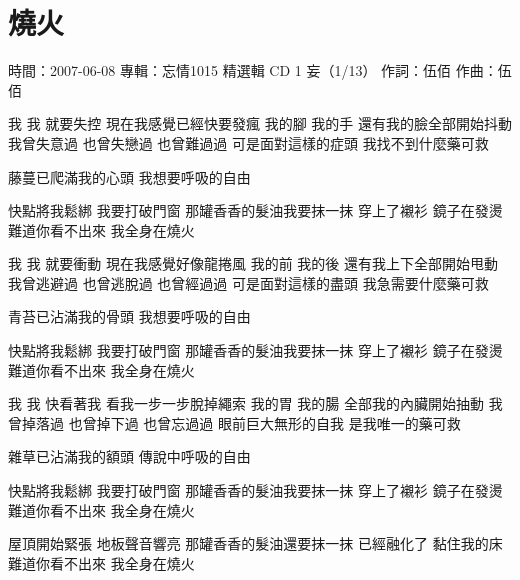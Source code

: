 \documentclass[UTF8,a4paper,oneside,twocolumn,12pt]{ctexbook}
\newcommand{\infopair}[2]{\textbullet #1：#2}
\newcommand{\zc}[1][伍佰]{\infopair{作詞}{#1}}
\newcommand{\zq}[1][伍佰]{\infopair{作曲}{#1}}
\newcommand{\zj}[1]{\infopair{專輯}{#1}}
\newcommand{\sj}[1]{\infopair{時間}{#1}}
\newenvironment{info}{\begin{flushleft}\kaishu
	}
	{\end{flushleft}\normalsize\yahei\par}
\newenvironment{lyric}{
	}
{}
\begin{document}
\section{燒火}
\begin{info}
	\sj{2007-06-08}
	\zj{忘情1015 精選輯 CD 1 妄（1/13）}
	\zc
	\zq
\end{info}
\begin{lyric}
	我 我 就要失控 現在我感覺已經快要發瘋
	我的腳 我的手 還有我的臉全部開始抖動
	我曾失意過 也曾失戀過 也曾難過過
	可是面對這樣的症頭 我找不到什麼藥可救

	藤蔓已爬滿我的心頭 我想要呼吸的自由

	快點將我鬆綁 我要打破門窗 那罐香香的髮油我要抹一抹
	穿上了襯衫 鏡子在發燙 難道你看不出來 我全身在燒火

	我 我 就要衝動 現在我感覺好像龍捲風
	我的前 我的後 還有我上下全部開始甩動
	我曾逃避過 也曾逃脫過 也曾經過過
	可是面對這樣的盡頭 我急需要什麼藥可救

	青苔已沾滿我的骨頭 我想要呼吸的自由

	快點將我鬆綁 我要打破門窗 那罐香香的髮油我要抹一抹
	穿上了襯衫 鏡子在發燙 難道你看不出來 我全身在燒火

	我 我 快看著我 看我一步一步脫掉繩索
	我的胃 我的腸 全部我的內臟開始抽動
	我曾掉落過 也曾掉下過 也曾忘過過
	眼前巨大無形的自我 是我唯一的藥可救

	雜草已沾滿我的額頭 傳說中呼吸的自由

	快點將我鬆綁 我要打破門窗 那罐香香的髮油我要抹一抹
	穿上了襯衫 鏡子在發燙 難道你看不出來 我全身在燒火

	屋頂開始緊張 地板聲音響亮 那罐香香的髮油還要抹一抹
	已經融化了 黏住我的床 難道你看不出來 我全身在燒火
\end{lyric}
\end{document}
